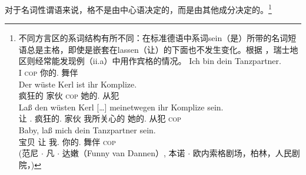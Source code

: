对于名词性谓语\label{page-Kasuskongruenz}来说，格不是由中心语决定的，而是由其他成分决定的。\footnote{%
不同方言区的系词结构有所不同：在标准德语中系词sein（是）所带的名词短语总是主格，即使是嵌套在lassen（让）的下面也不发生变化。根据 \citet*[{\S}\,1259]{Duden95-Authors}，瑞士地区则经常能发现例（ii.a）中用作宾格的情况。
\eal
\ex 
\gll Ich bin dein Tanzpartner.\\
     I \textsc{cop} 你的.\nom{} 舞伴\\
\ex 
\gll Der wüste Kerl ist ihr Komplize.\\
      疯狂的  家伙  \textsc{cop}  她的.\nom{} 从犯\\
\ex 
\gll Laß den wüsten Kerl [\ldots] meinetwegen ihr Komplize sein.\\
     让 .\acc{} 疯狂的.\acc{} 家伙 {} 我所关心的 她的.\nom{} 从犯 \textsc{cop}\\
 \citep*[{\S}\,6925]{Duden66-Authors}%
\ex 
\gll Baby, laß mich dein Tanzpartner sein.\\
     宝贝 让 我.\acc{} 你的.\nom{} 舞伴 \textsc{cop}\\
  (范尼 $\cdot$ 凡 $\cdot$ 达嫩（Funny van Dannen）, 本诺 $\cdot$ 欧内索格剧场，柏林，人民剧院，)
\zl

        \eal
        \zllast} 
